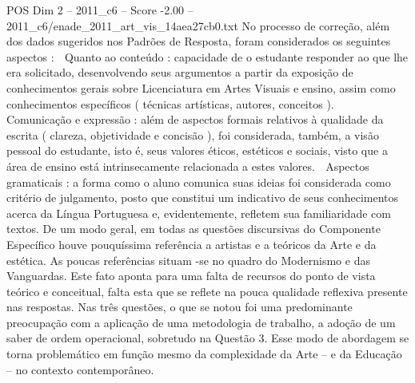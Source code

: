 \begin{textsample}{POS Dim 2 – 2011\_c6 – Score -2.00 – 2011\_c6/enade\_2011\_art\_vis\_14aea27cb0.txt}
No processo de correção, além dos dados sugeridos nos Padrões de Resposta, foram considerados os seguintes aspectos :  Quanto ao conteúdo : capacidade de o estudante responder ao que lhe era solicitado, desenvolvendo seus argumentos a partir da exposição de conhecimentos gerais sobre Licenciatura em Artes Visuais e ensino, assim como conhecimentos específicos ( técnicas artísticas, autores, conceitos ).  Comunicação e expressão : além de aspectos formais relativos à qualidade da escrita ( clareza, objetividade e concisão ), foi considerada, também, a visão pessoal do estudante, isto é, seus valores éticos, estéticos e sociais, visto que a área de ensino está intrinsecamente relacionada a estes valores.  Aspectos gramaticais : a forma como o aluno comunica suas ideias foi considerada como critério de julgamento, posto que constitui um indicativo de seus conhecimentos acerca da Língua Portuguesa e, evidentemente, refletem sua familiaridade com textos.
De um modo geral, em todas as questões discursivas do Componente Específico houve pouquíssima referência a artistas e a teóricos da Arte e da estética.
As poucas referências situam -se no quadro do Modernismo e das Vanguardas.
Este fato aponta para uma falta de recursos do ponto de vista teórico e conceitual, falta esta que se reflete na pouca qualidade reflexiva presente nas respostas.
Nas três questões, o que se notou foi uma predominante preocupação com a aplicação de uma metodologia de trabalho, a adoção de um saber de ordem operacional, sobretudo na Questão 3.
Esse modo de abordagem se torna problemático em função mesmo da complexidade da Arte – e da Educação – no contexto contemporâneo.

\end{textsample}
